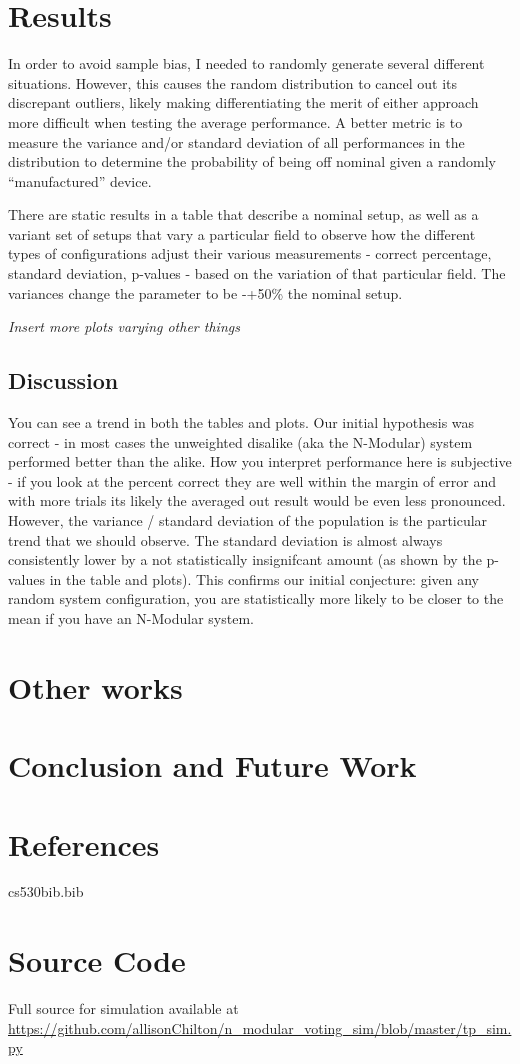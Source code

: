 \documentclass[article]{IEEEtran}
\begin{document}
\section{Results}
In order to avoid sample bias, I needed to randomly generate several different situations. However, this causes the random distribution to cancel out its discrepant outliers, likely making differentiating the merit of either approach more difficult when testing the average performance. A better metric is to measure the variance and/or standard deviation of all performances in the distribution to determine the probability of being off nominal given a randomly “manufactured” device.
\par
There are static results in a table that describe a nominal setup, as well as a variant set of setups that vary a particular field to observe how the different types of configurations adjust their various measurements - correct percentage, standard deviation, p-values - based on the variation of that particular field. The variances change the parameter to be -+50\% the nominal setup.





\textit{Insert more plots varying other things}

\subsection{Discussion}
\par You can see a trend in both the tables and plots. Our initial hypothesis was correct - in most cases the unweighted disalike (aka the N-Modular) system performed better than the alike. How you interpret performance here is subjective - if you look at the percent correct they are well within the margin of error and with more trials its likely the averaged out result would be even less pronounced. However, the variance / standard deviation of the population is the particular trend that we should observe. The standard deviation is almost always consistently lower by a not statistically insignifcant amount (as shown by the p-values in the table and plots). This confirms our initial conjecture: given any random system configuration, you are statistically more likely to be closer to the mean if you have an N-Modular system.

\section{Other works}
\section{Conclusion and Future Work}
\section{References}

\begin{filecontents}[overwrite]{cs530bib.bib}


\end{filecontents}

%
\appendix
\section{Source Code}
Full source for simulation available at \url{ https://github.com/allisonChilton/n_modular_voting_sim/blob/master/tp_sim.py}
\end{document}
